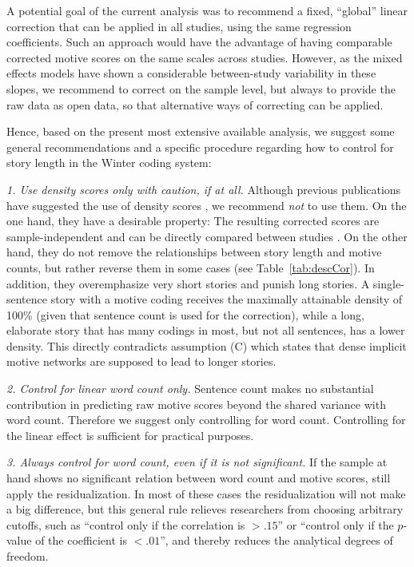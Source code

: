 \documentclass[man,a4paper,mask]{apa6}\usepackage[]{graphicx}\usepackage[]{color}
\begin{document}
A potential goal of the current analysis was to recommend a fixed, ``global'' linear correction that can be applied in all studies, using the same regression coefficients. Such an approach would have the advantage of having comparable corrected motive scores on the same scales across studies. However, as the mixed effects models have shown a considerable between-study variability in these slopes, we recommend to correct on the sample level, but always to provide the raw data as open data, so that alternative ways of correcting can be applied.

Hence, based on the present most extensive available analysis, we suggest some general recommendations and a specific procedure regarding how to control for story length in the Winter coding system:

\emph{1. Use density scores only with caution, if at all.} Although previous publications have suggested the use of density scores \parencite[e.g., ][]{winter_MeasuringPersonalityDistance_1991}, we recommend \emph{not} to use them. On the one hand, they have a desirable property: The resulting corrected scores are sample-independent and can be directly compared between studies \parencite{schultheiss_MeasuringImplicitMotives_2007}. On the other hand, they do not remove the relationships between story length and motive counts, but rather reverse them in some cases (see Table~\ref{tab:descCor}). In addition, they overemphasize very short stories and punish long stories. A single-sentence story with a motive coding receives the maximally attainable density of 100\% (given that sentence count is used for the correction), while a long, elaborate story that has many codings in most, but not all sentences, has a lower density. This directly contradicts assumption (C) which states that dense implicit motive networks are supposed to lead to longer stories.

\emph{2. Control for linear word count only.} Sentence count makes no substantial contribution in predicting raw motive scores beyond the shared variance with word count. Therefore we suggest only controlling for word count. Controlling for the linear effect is sufficient for practical purposes.

\emph{3. Always control for word count, even if it is not significant.} If the sample at hand shows no significant relation between word count and motive scores, still apply the residualization. In most of these cases the residualization will not make a big difference, but this general rule relieves researchers from choosing arbitrary cutoffs, such as ``control only if the correlation is $> .15$'' or ``control only if the $p$-value of the coefficient is $<.01$'', and thereby reduces the analytical degrees of freedom.
\end{document}
